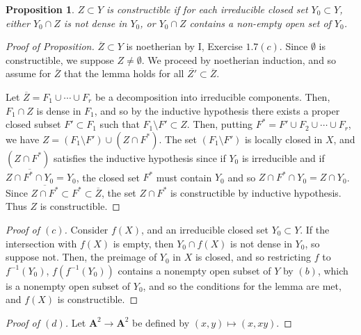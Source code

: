 \documentclass[10pt]{article}
\newtheorem{proposition}{Proposition}
\theoremstyle{definition}
\theoremstyle{remark}
\numberwithin{equation}{section}
\numberwithin{figure}{subsubsection}
\begin{document}
\begin{proposition}
  $Z \subset Y$ is constructible if for each irreducible closed set $Y_0 \subset Y$, either $Y_0 \cap Z$ is not dense in $Y_0$, or $Y_0 \cap Z$ contains a non-empty open set of $Y_0$.
\end{proposition}
\begin{proof}[Proof of Proposition]
  $\overline{Z} \subset Y$ is noetherian by I, Exercise $1.7(c)$. Since $\emptyset$ is constructible, we suppose $Z \ne \emptyset$. We proceed by noetherian induction, and so assume for $\overline{Z}$ that the lemma holds for all $\overline{Z'} \subset \overline{Z}$.
  \par Let $\overline{Z} = F_1 \cup \cdots \cup F_r$ be a decomposition into irreducible components. Then, $F_1 \cap Z$ is dense in $F_1$, and so by the inductive hypothesis there exists a proper closed subset $F' \subset F_1$ such that $F_1 \setminus F' \subset Z$. Then, putting $F^* = F' \cup F_2 \cup \cdots \cup F_r$, we have $Z = (F_1 \setminus F') \cup (Z \cap F^*)$. The set $(F_1 \setminus F')$ is locally closed in $X$, and $(Z \cap F^*)$ satisfies the inductive hypothesis since if $Y_0$ is irreducible and if $\overline{Z \cap F^* \cap Y_0} = Y_0$, the closed set $F^*$ must contain $Y_0$ and so $Z \cap F^* \cap Y_0 = Z \cap Y_0$. Since $\overline{Z \cap F^*} \subset F^* \subset \overline{Z}$, the set $Z \cap F^*$ is constructible by inductive hypothesis. Thus $Z$ is constructible.
\end{proof}
\begin{proof}[Proof of $(c)$]
  Consider $f(X)$, and an irreducible closed set $Y_0 \subset Y$. If the intersection with $f(X)$ is empty, then $Y_0 \cap f(X)$ is not dense in $Y_0$, so suppose not. Then, the preimage of $Y_0$ in $X$ is closed, and so restricting $f$ to $f^{-1}(Y_0)$, $f(f^{-1}(Y_0))$ contains a nonempty open subset of $Y$ by $(b)$, which is a nonempty open subset of $Y_0$, and so the conditions for the lemma are met, and $f(X)$ is constructible.
\end{proof}
\begin{proof}[Proof of $(d)$]
  Let $\mathbf{A}^2 \to \mathbf{A}^2$ be defined by $(x,y) \mapsto (x,xy)$.
\end{proof}
\end{document}

